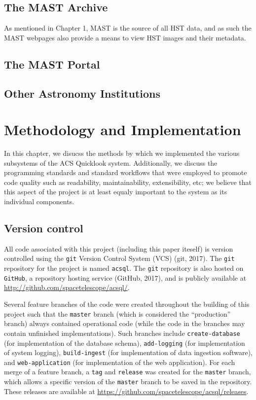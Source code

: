 \documentclass[10pt,journal,compsoc]{IEEEtran}
\begin{document}
\subsection{The MAST Archive}

As mentioned in Chapter 1, MAST is the source of all HST data, and as such the MAST webpages also provide a means to
view HST images and their metadata.

\subsection{The MAST Portal}

\subsection{Other Astronomy Institutions}


\section{Methodology and Implementation}\label{sec:methodology}

In this chapter, we disucss the methods by which we implemented the various subsystems
of the ACS Quicklook system.  Additionally, we discuss the programming standards and
standard workflows that were employed to promote code quality such as readability,
maintainability, extensibility, etc; we believe that this aspect of the project is
at least equaly important to the system as its individual components.


\subsection{Version control}

All code associated with this project (including this paper iteself) is version
controlled using the \texttt{git} Version Control System (VCS) (git, 2017).
The \texttt{git} repository for the project is named \texttt{acsql}.
The \texttt{git} repository is also hosted on \texttt{GitHub}, a repository
hosting service (GitHub, 2017), and is publicly available at
\url{http://github.com/spacetelescope/acsql/}.

Several feature branches of the code were created throughout the building of this project
such that the \texttt{master} branch (which is considered the ``production'' branch)
always contained operational code (while the code in the branches may contain unfinished
implementations).  Such branches include \texttt{create-database} (for implementation of
the database schema), \texttt{add-logging} (for implementation of system logging),
\texttt{build-ingest} (for implementation of data ingestion software), and
\texttt{web-application} (for implementation of the web application).  For each merge of a
feature branch, a \texttt{tag} and \texttt{release} was created for the \texttt{master} branch,
which allows a specific version of the \texttt{master} branch to be saved in the
repository.  These releases are available at
\url{https://github.com/spacetelescope/acsql/releases}.
\end{document}
